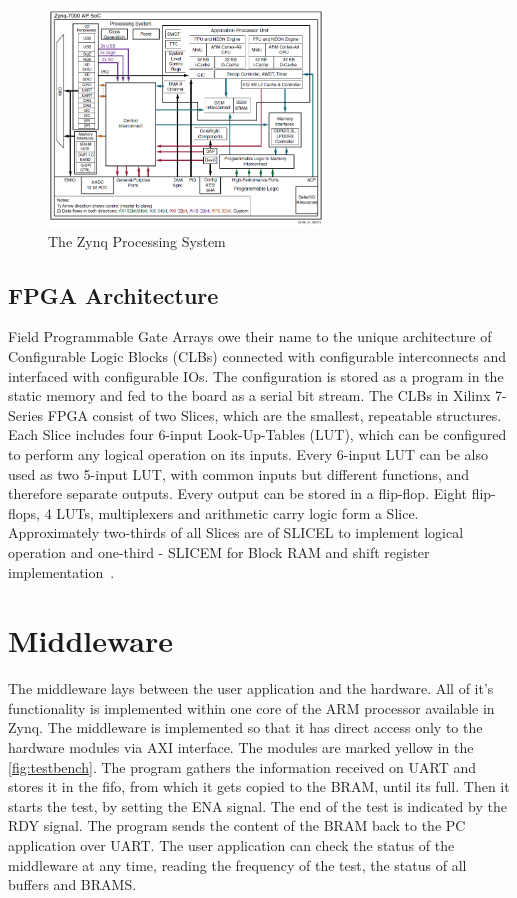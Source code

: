 \begin{figure}[H]
\centering
\includegraphics[width=0.65\textwidth]{figures/Zynq.png}
\caption{The Zynq Processing System~\cite{book:ZynqBook}}
\label{fig:Zynq}
\end{figure}

\subsection{FPGA Architecture}\label{ssec:SLICE}
Field Programmable Gate Arrays owe their name to the unique architecture of Configurable Logic Blocks (CLBs) connected with configurable interconnects and interfaced with configurable IOs. The configuration is stored as a program in the static memory and fed to the board as a serial bit stream. The CLBs in Xilinx 7-Series FPGA consist of two Slices, which are the smallest, repeatable structures. Each Slice includes four 6-input Look-Up-Tables (LUT), which can be configured to perform any logical operation on its inputs. Every 6-input LUT can be also used as two 5-input LUT, with common inputs but different functions, and therefore separate outputs. Every output can be stored in a flip-flop. Eight flip-flops, 4 LUTs, multiplexers and arithmetic carry logic form a Slice. Approximately two-thirds of all Slices are of SLICEL to implement logical operation and one-third - SLICEM for Block RAM and shift register implementation~\cite{report:CLB}.

\section{Middleware}
The middleware lays between the user application and the hardware. All of it's functionality is implemented within one core of the ARM processor available in Zynq. The middleware is implemented so that it has direct access only to the hardware modules via AXI interface. The modules are marked yellow in the \autoref{fig:testbench}. The program gathers the information received on UART and stores it in the fifo, from which it gets copied to the BRAM, until its full. Then it starts the test, by setting the ENA signal. The end of the test is indicated by the RDY signal. The program sends the content of the BRAM back to the PC application over UART. The user application can check the status of the middleware at any time, reading the frequency of the test, the status of all buffers and BRAMS.

